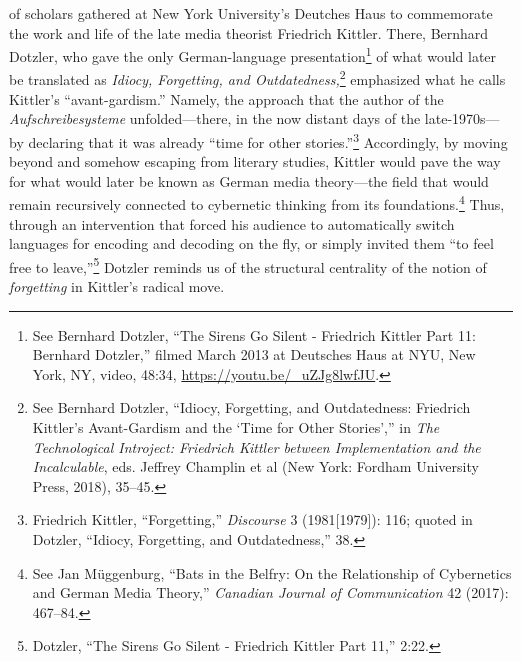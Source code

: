 \documentclass{tufte-handout}
\begin{document}
  of scholars gathered at New York University's
Deutches Haus to commemorate the work and life of the late media
theorist Friedrich Kittler. There, Bernhard Dotzler, who gave the only
German-language presentation\footnote{See Bernhard Dotzler, ``The Sirens
  Go Silent - Friedrich Kittler Part 11: Bernhard Dotzler,'' filmed
  March 2013 at Deutsches Haus at NYU, New York, NY, video, 48:34,
  \url{https://youtu.be/_uZJg8lwfJU}.} of what would later be translated
as \emph{Idiocy, Forgetting, and Outdatedness,}\footnote{See Bernhard
  Dotzler, ``Idiocy, Forgetting, and Outdatedness: Friedrich Kittler's
  Avant-Gardism and the `Time for Other Stories','' in \emph{The
  Technological Introject: Friedrich Kittler between Implementation and
  the Incalculable}, eds. Jeffrey Champlin et al (New York: Fordham
  University Press, 2018), 35--45.} emphasized what he calls Kittler's
``avant-gardism.'' Namely, the approach that the author of the
\emph{Aufschreibesysteme} unfolded---there, in the now distant days of
the late-1970s---by declaring that it was already ``time for other
stories.''\footnote{Friedrich Kittler, ``Forgetting,'' \emph{Discourse}
  3 (1981{[}1979{]}): 116; quoted in Dotzler, ``Idiocy, Forgetting, and
  Outdatedness,'' 38.} Accordingly, by moving beyond and somehow
escaping from literary studies, Kittler would pave the way for what
would later be known as German media theory---the field that would
remain recursively connected to cybernetic thinking from its
foundations.\footnote{See Jan Müggenburg, ``Bats in the Belfry: On the
  Relationship of Cybernetics and German Media Theory,'' \emph{Canadian
  Journal of Communication} 42 (2017): 467--84.} Thus, through an
intervention that forced his audience to automatically switch languages
for encoding and decoding on the fly, or simply invited them ``to feel
free to leave,''\footnote{Dotzler, ``The Sirens Go Silent - Friedrich
  Kittler Part 11,'' 2:22.} Dotzler reminds us of the structural
centrality of the notion of \emph{forgetting} in Kittler's radical move.
\end{document}
